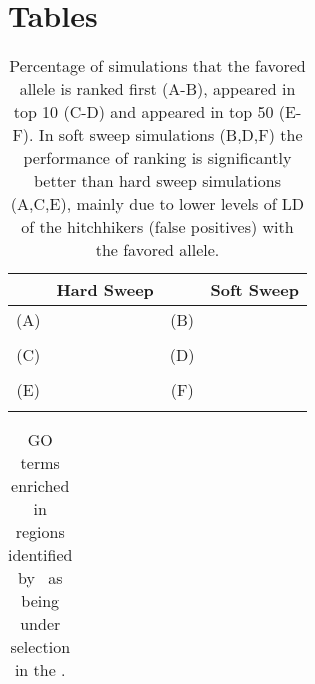 \section*{Tables}

\begin{table}[H]
	\begin{tabular}{cc|cc}
		& Hard Sweep&  & Soft Sweep\\
		\hline
		(A) & & (B) & \\
		& {}
		& &{ }\\
		\hline
		(C) & & (D) & \\
		& {}
		& &{ }\\
		\hline
		(E) & & (F) & \\
		& {}
		& &{ }\\
		\hline
	\end{tabular}
	\caption{Percentage of simulations that the favored allele is ranked first 
	(A-B), 
	appeared in top 10 (C-D) and appeared in top 50 (E-F). In soft sweep 
	simulations (B,D,F) the performance of ranking is significantly better than 
	hard sweep simulations (A,C,E), mainly due to lower levels of LD of the 
	hitchhikers (false positives) with the favored allele.}\label{tab:rank}
\end{table}

\begin{table}[H]
	\begin{tabular}{c}
		
	\end{tabular}
	\caption{GO terms enriched in regions identified by \comale\ as being under 
	selection in the \data.}\label{tab:Fisher}
\end{table}

